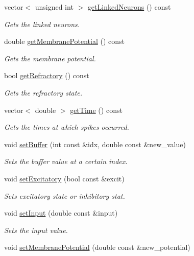 \begin{DoxyCompactItemize}
vector$<$ unsigned int $>$ \hyperlink{classNeuron_a3495ab6e72f3f2e74fe4e0396400f0e4}{get\-Linked\-Neurons} () const 
\begin{DoxyCompactList}\small\item\em Gets the linked neurons. \end{DoxyCompactList}\item 
double \hyperlink{classNeuron_a86341dee7a81765fe4840777a008c688}{get\-Membrane\-Potential} () const 
\begin{DoxyCompactList}\small\item\em Gets the membrane potential. \end{DoxyCompactList}\item 
bool \hyperlink{classNeuron_ac648235e5b9e8ebf05b50afd507c9348}{get\-Refractory} () const 
\begin{DoxyCompactList}\small\item\em Gets the refractory state. \end{DoxyCompactList}\item 
vector$<$ double $>$ \hyperlink{classNeuron_a9c4fb30247f30a3cbb8fc1e93a3f06d2}{get\-Time} () const 
\begin{DoxyCompactList}\small\item\em Gets the times at which spikes occurred. \end{DoxyCompactList}\item 
void \hyperlink{classNeuron_af1c7208a3e5b06a8aa0019ebd0418c2c}{set\-Buffer} (int const \&idx, double const \&new\-\_\-value)
\begin{DoxyCompactList}\small\item\em Sets the buffer value at a certain index. \end{DoxyCompactList}\item 
void \hyperlink{classNeuron_a9fa17ac0c2a7de0a19cc514e235d7762}{set\-Excitatory} (bool const \&excit)
\begin{DoxyCompactList}\small\item\em Sets excitatory state or inhibitory stat. \end{DoxyCompactList}\item 
void \hyperlink{classNeuron_a63412f798c2ef1c8c41199b61b3c3d9a}{set\-Input} (double const \&input)
\begin{DoxyCompactList}\small\item\em Sets the input value. \end{DoxyCompactList}\item 
void \hyperlink{classNeuron_a5b44817a5923e963314bf8b6fa018635}{set\-Membrane\-Potential} (double const \&new\-\_\-potential)

\end{DoxyCompactItemize}
